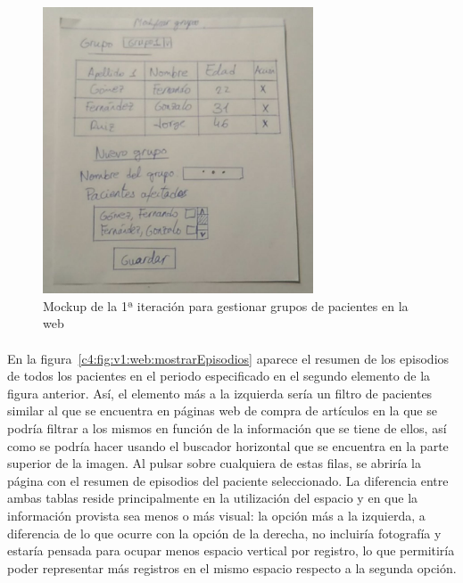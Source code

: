 \begin{figure}[H]
    \centering
    \includegraphics[width=0.8\linewidth, height=8.5cm]{Imagenes/04DescProblema/mockups/v1/web/03-modificarGrupo.jpg}
    \caption[Mockup de la 1ª iteración para gestionar grupos de pacientes en la web]{Mockup de la 1ª iteración para gestionar grupos de pacientes en la web}
    \label{c4:fig:v1:web:modificarGrupo}
\end{figure}

\paragraph{}
En la figura~\ref{c4:fig:v1:web:mostrarEpisodios} aparece el resumen de los episodios de todos los pacientes en el periodo especificado en el segundo elemento de la figura anterior. Así, el elemento más a la izquierda sería un filtro de pacientes similar al que se encuentra en páginas web de compra de artículos en la que se podría filtrar a los mismos en función de la información que se tiene de ellos, así como se podría hacer usando el buscador horizontal que se encuentra en la parte superior de la imagen. Al pulsar sobre cualquiera de estas filas, se abriría la página con el resumen de episodios del paciente seleccionado. La diferencia entre ambas tablas reside principalmente en la utilización del espacio y en que la información provista sea menos o más visual: la opción más a la izquierda, a diferencia de lo que ocurre con la opción de la derecha, no incluiría fotografía y estaría pensada para ocupar menos espacio vertical por registro, lo que permitiría poder representar más registros en el mismo espacio respecto a la segunda opción.

